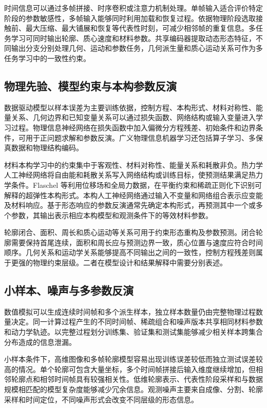 时间信息可以通过多帧拼接、时序卷积或注意力机制处理。单帧输入适合评价特定阶段的参数敏感性，多帧输入能够同时利用加载和恢复过程。依据物理阶段选取接触前、最大压缩、最大铺展和恢复等代表性时刻，可减少相邻帧的重复信息。多任务学习可同时输出轮廓、质心速度和材料参数\cite{caruana1997multitask}。共享编码器提取动态形态特征，不同输出分支分别处理几何、运动和参数任务，几何派生量和质心运动关系可作为多任务学习中的一致性约束。

\subsection{物理先验、模型约束与本构参数反演}

数据驱动模型以样本误差为主要训练依据，控制方程、本构形式、材料对称性、能量关系、几何边界和已知变量关系可以通过损失函数、网络结构或输入变量进入学习过程。物理信息神经网络在损失函数中加入偏微分方程残差、初始条件和边界条件，可用于正问题求解和参数反演\cite{raissi2019pinn}。广义物理信息机器学习还包括算子学习、多保真数据和物理结构编码\cite{karniadakis2021piml}。

材料本构学习中的约束集中于客观性、材料对称性、能量关系和耗散非负。热力学人工神经网络将自由能和耗散关系写入网络结构或训练目标，使预测结果满足热力学条件\cite{masi2021tann}。Flaschel 等利用位移场和全局力数据，在平衡约束和稀疏正则化下识别可解释的超弹性本构形式\cite{flaschel2021hyperelastic}。本构人工神经网络通过输入不变量和网络组合表示应变能及材料响应\cite{linka2021constitutive,linka2023cann}。基于形态响应的参数反演通常先确定本构形式，再预测其中一个或多个参数，其输出表示相应本构模型和观测条件下的等效材料参数。

轮廓闭合、面积、周长和质心运动等关系可用于约束形态重构及参数预测。闭合轮廓需要保持首尾连续，面积和周长应与预测边界一致，质心位置与速度应符合时间顺序。几何关系和运动学关系能够提高不同输出之间的一致性，控制方程残差则属于更强的物理约束层级。二者在模型设计和结果解释中需要分别表述。

\subsection{小样本、噪声与多参数反演}

数值模拟可以生成连续时间帧和多个派生样本，独立样本数量仍由完整物理过程数量决定。同一计算过程产生的不同时间帧、稀疏组合和噪声版本共享相同材料参数和动力学轨迹。以完整过程划分训练集、验证集和测试集能够减少相关样本跨集合分布造成的信息泄漏\cite{roberts2017crossvalidation}。

小样本条件下，高维图像和多帧轮廓模型容易出现训练误差较低而独立测试误差较高的情况。单个轮廓可包含大量坐标，多个时间帧拼接后输入维度继续增加，但相邻轮廓点和相邻时间帧具有较强相关性。低维轮廓表示、代表性阶段采样和与数据规模相匹配的模型复杂度能够减少冗余信息\cite{vabalas2019limited}。观测噪声主要来自成像、分割、轮廓采样和时间定位，不同噪声形式会改变不同层级的形态信息。


